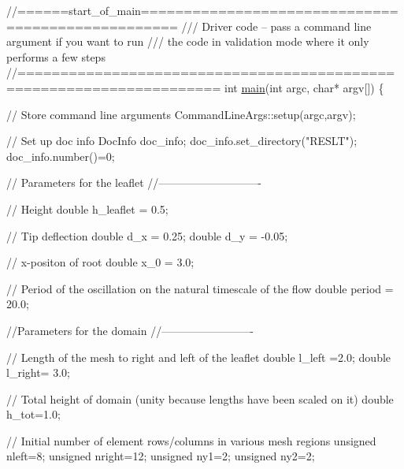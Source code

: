  
\begin{DoxyCodeInclude}
\textcolor{comment}{//======start\_of\_main==================================================}
\textcolor{comment}{/// Driver code -- pass a command line argument if you want to run}
\textcolor{comment}{}\textcolor{comment}{/// the code in validation mode where it only performs a few steps}
\textcolor{comment}{}\textcolor{comment}{//=====================================================================}
\textcolor{keywordtype}{int} \hyperlink{channel__with__leaflet_8cc_a0ddf1224851353fc92bfbff6f499fa97}{main}(\textcolor{keywordtype}{int} argc, \textcolor{keywordtype}{char}* argv[])
\{

 \textcolor{comment}{// Store command line arguments}
 CommandLineArgs::setup(argc,argv);
 
 \textcolor{comment}{// Set up doc info}
 DocInfo doc\_info; 
 doc\_info.set\_directory(\textcolor{stringliteral}{"RESLT"});
 doc\_info.number()=0;
 
 \textcolor{comment}{// Parameters for the leaflet}
 \textcolor{comment}{//----------------------------}
 
 \textcolor{comment}{// Height}
 \textcolor{keywordtype}{double} h\_leaflet = 0.5;


 \textcolor{comment}{// Tip deflection}
 \textcolor{keywordtype}{double} d\_x = 0.25;
 \textcolor{keywordtype}{double} d\_y = -0.05;

 \textcolor{comment}{// x-positon of root}
 \textcolor{keywordtype}{double} x\_0 = 3.0; 

 \textcolor{comment}{// Period of the oscillation on the natural timescale of the flow}
 \textcolor{keywordtype}{double} period = 20.0;


 \textcolor{comment}{//Parameters for the domain}
 \textcolor{comment}{//-------------------------}

 \textcolor{comment}{// Length of the mesh to right and left of the leaflet}
 \textcolor{keywordtype}{double} l\_left =2.0;
 \textcolor{keywordtype}{double} l\_right= 3.0;

 \textcolor{comment}{// Total height of domain (unity because lengths have been scaled on it)}
 \textcolor{keywordtype}{double} h\_tot=1.0;

 \textcolor{comment}{// Initial number of element rows/columns in various mesh regions}
 \textcolor{keywordtype}{unsigned} nleft=8;
 \textcolor{keywordtype}{unsigned} nright=12;
 \textcolor{keywordtype}{unsigned} ny1=2;
 \textcolor{keywordtype}{unsigned} ny2=2; 

\end{DoxyCodeInclude}


